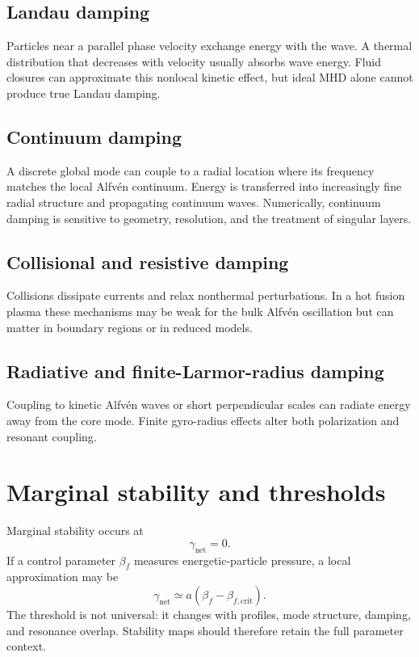 \documentclass[11pt]{article}
\begin{document}
\subsection{Landau damping}
Particles near a parallel phase velocity exchange energy with the wave. A thermal distribution that decreases with velocity usually absorbs wave energy. Fluid closures can approximate this nonlocal kinetic effect, but ideal MHD alone cannot produce true Landau damping.

\subsection{Continuum damping}
A discrete global mode can couple to a radial location where its frequency matches the local Alfv\'en continuum. Energy is transferred into increasingly fine radial structure and propagating continuum waves. Numerically, continuum damping is sensitive to geometry, resolution, and the treatment of singular layers.

\subsection{Collisional and resistive damping}
Collisions dissipate currents and relax nonthermal perturbations. In a hot fusion plasma these mechanisms may be weak for the bulk Alfv\'en oscillation but can matter in boundary regions or in reduced models.

\subsection{Radiative and finite-Larmor-radius damping}
Coupling to kinetic Alfv\'en waves or short perpendicular scales can radiate energy away from the core mode. Finite gyro-radius effects alter both polarization and resonant coupling.

\section{Marginal stability and thresholds}
Marginal stability occurs at
\begin{equation}
\gamma_{\mathrm{net}}=0.
\end{equation}
If a control parameter $\beta_f$ measures energetic-particle pressure, a local approximation may be
\begin{equation}
\gamma_{\mathrm{net}}\simeq a(\beta_f-\beta_{f,\mathrm{crit}}).
\end{equation}
The threshold is not universal: it changes with profiles, mode structure, damping, and resonance overlap. Stability maps should therefore retain the full parameter context.
\end{document}
